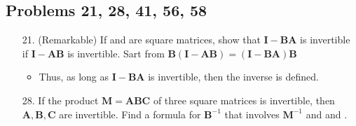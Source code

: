 \begin{itemize}
\begin{itemize}
  \end{itemize}
  \vspace{24pt}

  \subsection{Problems 21, 28, 41, 56, 58}
  \begin{enumerate}\color{foreground-2}
    \item[21.] (Remarkable) If  and  are square matrices, show
      that \(\bm{I}-\bm{BA}\) is invertible if \(\bm{I}-\bm{AB}\) is
      invertible. Sart from \(\bm{B}(\bm{I} - \bm{AB}) = (\bm{I} - \bm{BA})\bm{B}\)
      \vspace{-24pt}
      \begin{itemize}\color{foreground}
        \item Thus, as long as \(\bm{I} - \bm{BA}\) is invertible, then the
          inverse is defined.
      \end{itemize}

    \item[28.] If the product \(\bm{M} = \bm{ABC}\) of three square matrices is invertible, then
        \(\bm{A}, \bm{B}, \bm{C}\) are invertible. Find a formula for \(
        \bm{B}^{-1} \) that involves \( \bm{M}^{-1} \) and  and .
        \vspace{-16pt}


\end{enumerate}
\end{itemize}
